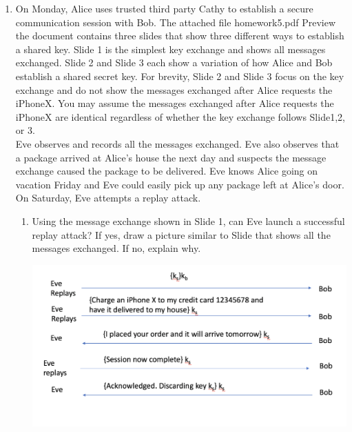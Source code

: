 \documentclass[12pt]{article}
\begin{document}
\renewcommand{\headrulewidth}{0.4pt}
\vspace{-3mm}
\begin{enumerate}
\item On Monday, Alice uses trusted third party Cathy to establish a secure communication session with Bob. The attached file homework5.pdf Preview the document contains three slides that show three different ways to establish a shared key. Slide 1 is the simplest key exchange and shows all messages exchanged.  Slide 2 and Slide 3 each show a variation of how Alice and Bob establish a shared secret key.  For brevity, Slide 2 and Slide 3 focus on the key exchange and do not show the messages exchanged after Alice requests the iPhoneX.  You may assume the messages exchanged after Alice requests the iPhoneX are identical regardless of whether the key exchange follows Slide1,2, or 3. \\

Eve observes and records all the messages exchanged.  Eve also observes that a package arrived at Alice's house the next day and suspects the message exchange caused the package to be delivered.  Eve knows Alice going on vacation Friday and Eve could easily pick up any package left at Alice's door.  On Saturday, Eve attempts a replay attack.
\begin{enumerate}
  \item Using the message exchange shown in Slide 1, can Eve launch a successful replay attack? If yes, draw a picture similar to Slide that shows all the messages exchanged. If no, explain why. \\

\begin{center}
  \includegraphics[scale=0.4]{prob1part1.png} \\
\end{center}


\end{enumerate}
\end{enumerate}
\end{document}
